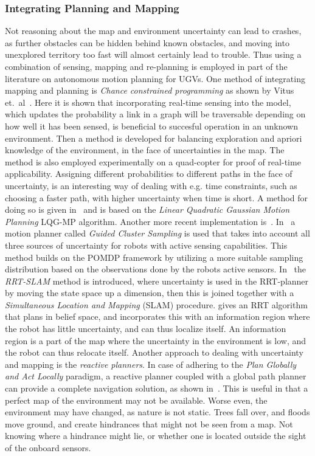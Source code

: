 \subsubsection{Integrating Planning and Mapping}
Not reasoning about the map and environment uncertainty can lead to crashes, as
further obstacles can be hidden behind known obstacles, and moving into
unexplored territory too fast will almost certainly lead to trouble. Thus using
a combination of sensing, mapping and re-planning is employed in part of the
literature on autonomous motion planning for UGVs. One method of integrating
mapping and planning is \textit{Chance constrained programming } as shown by
Vitus et.\ al~\cite{vitusHierarchicalMethodStochastic2012}. Here it is shown
that incorporating real-time sensing into the model, which updates the
probability a link in a graph will be traversable depending on how well it has
been sensed, is beneficial to succesful operation in an unknown environment.
Then a method is developed for balancing exploration and apriori knowledge of
the environment, in the face of uncertainties in the map. The method is also
employed experimentally on a quad-copter for proof of real-time applicability.
Assigning different probabilities to different paths in the face of uncertainty,
is an interesting way of dealing with e.g. time constraints, such as choosing a
faster path, with higher uncertainty when time is short. A method for doing so
is given in~\cite{vandenbergLQGMPOptimizedPath2011} and is based on the
\textit{Linear Quadratic Gaussian Motion Planning} LQG-MP algorithm. Another
more recent implementation is~\cite{blakeEfficientComputationCollision2018}.
In~\cite{Kurniawati_2011} a motion planner called \textit{Guided Cluster
  Sampling} is used that takes into account all three sources of uncertainty for
robots with active sensing capabilities. This method builds on the POMDP
framework by utilizing a more suitable sampling distribution based on the
observations done by the robots active sensors.
In~\cite{huangRRTSLAMMotionPlanning2008} the \textit{RRT-SLAM} method is
introduced, where uncertainty is used in the RRT-planner by moving the state
space up a dimension, then this is joined together with a \textit{Simultaneous
  Location and Mapping} (SLAM) procedure.
\cite{bryRapidlyexploringRandomBelief2011} gives an RRT algorithm that plans in
belief space, and incorporates this with an information region where the robot
has little uncertainty, and can thus localize itself. An information region is a
part of the map where the uncertainty in the environment is low, and the robot
can thus relocate itself. Another approach to dealing with uncertainty and
mapping is the \textit{reactive planners}. In case of adhering to the
\textit{Plan Globally and Act Locally} paradigm, a reactive planner coupled with
a global path planner can provide a complete navigation solution, as shown
in~\cite{djekouneSensorBasedNavigation2009}. This is useful in that a perfect
map of the environment may not be available. Worse even, the environment may
have changed, as nature is not static. Trees fall over, and floods move ground,
and create hindrances that might not be seen from a map. Not knowing where a
hindrance might lie, or whether one is located outside the sight of the onboard
sensors.

